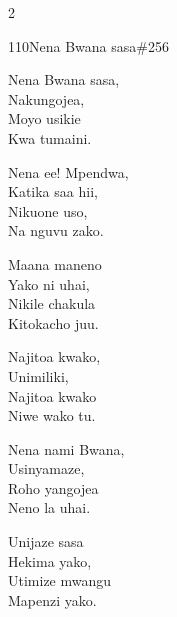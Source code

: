 \documentclass{article}
\begin{document}
\begin{multicols}{2}
\begin{hymn}{110}{Nena Bwana sasa}{\#256}
\begin{stanza}
Nena Bwana sasa,\\
Nakungojea,\\
Moyo usikie\\
Kwa tumaini.
\end{stanza}
\begin{stanza}
Nena ee! Mpendwa,\\
Katika saa hii,\\
Nikuone uso,\\
Na nguvu zako.
\end{stanza}
\begin{stanza}
Maana maneno\\
Yako ni uhai,\\
Nikile chakula\\
Kitokacho juu.
\end{stanza}
\begin{stanza}
Najitoa kwako,\\
Unimiliki,\\
Najitoa kwako\\
Niwe wako tu.
\end{stanza}
\begin{stanza}
Nena nami Bwana,\\
Usinyamaze,\\
Roho yangojea\\
Neno la uhai.
\end{stanza}
\begin{stanza}
Unijaze sasa\\
Hekima yako,\\
Utimize mwangu\\
Mapenzi yako.
\end{stanza}
\end{hymn}


\end{multicols}
\end{document}
